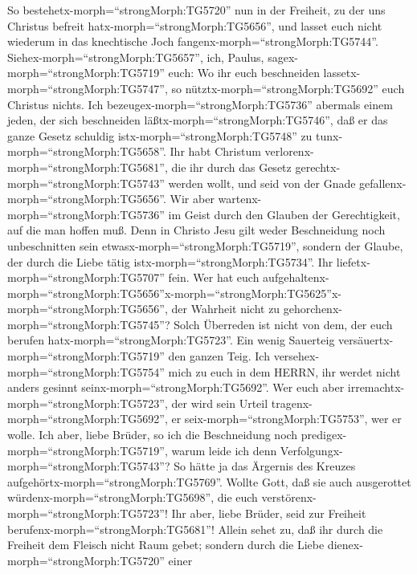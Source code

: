  So bestehetx-morph=``strongMorph:TG5720'' nun in der
Freiheit, zu der uns Christus befreit hatx-morph=``strongMorph:TG5656'',
und lasset euch nicht wiederum in das knechtische Joch
fangenx-morph=``strongMorph:TG5744''. 
Siehex-morph=``strongMorph:TG5657'', ich, Paulus,
sagex-morph=``strongMorph:TG5719'' euch: Wo ihr euch beschneiden
lassetx-morph=``strongMorph:TG5747'', so
nütztx-morph=``strongMorph:TG5692'' euch Christus nichts. 
Ich bezeugex-morph=``strongMorph:TG5736'' abermals einem jeden, der sich
beschneiden läßtx-morph=``strongMorph:TG5746'', daß er das ganze Gesetz
schuldig istx-morph=``strongMorph:TG5748'' zu
tunx-morph=``strongMorph:TG5658''.  Ihr habt Christum
verlorenx-morph=``strongMorph:TG5681'', die ihr durch das Gesetz
gerechtx-morph=``strongMorph:TG5743'' werden wollt, und seid von der
Gnade gefallenx-morph=``strongMorph:TG5656''.  Wir aber
wartenx-morph=``strongMorph:TG5736'' im Geist durch den Glauben der
Gerechtigkeit, auf die man hoffen muß.  Denn in Christo Jesu
gilt weder Beschneidung noch unbeschnitten sein
etwasx-morph=``strongMorph:TG5719'', sondern der Glaube, der durch die
Liebe tätig istx-morph=``strongMorph:TG5734''.  Ihr
liefetx-morph=``strongMorph:TG5707'' fein. Wer hat euch
aufgehaltenx-morph=``strongMorph:TG5656''\textbar x-morph=``strongMorph:TG5625''x-morph=``strongMorph:TG5656'',
der Wahrheit nicht zu gehorchenx-morph=``strongMorph:TG5745''?
 Solch Überreden ist nicht von dem, der euch berufen
hatx-morph=``strongMorph:TG5723''.  Ein wenig Sauerteig
versäuertx-morph=``strongMorph:TG5719'' den ganzen Teig. 
Ich versehex-morph=``strongMorph:TG5754'' mich zu euch in dem HERRN, ihr
werdet nicht anders gesinnt seinx-morph=``strongMorph:TG5692''. Wer euch
aber irremachtx-morph=``strongMorph:TG5723'', der wird sein Urteil
tragenx-morph=``strongMorph:TG5692'', er
seix-morph=``strongMorph:TG5753'', wer er wolle.  Ich aber,
liebe Brüder, so ich die Beschneidung noch
predigex-morph=``strongMorph:TG5719'', warum leide ich denn
Verfolgungx-morph=``strongMorph:TG5743''? So hätte ja das Ärgernis des
Kreuzes aufgehörtx-morph=``strongMorph:TG5769''.  Wollte
Gott, daß sie auch ausgerottet würdenx-morph=``strongMorph:TG5698'', die
euch verstörenx-morph=``strongMorph:TG5723''!  Ihr aber,
liebe Brüder, seid zur Freiheit berufenx-morph=``strongMorph:TG5681''!
Allein sehet zu, daß ihr durch die Freiheit dem Fleisch nicht Raum
gebet; sondern durch die Liebe dienex-morph=``strongMorph:TG5720'' einer
